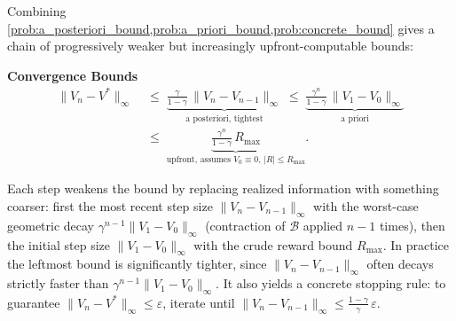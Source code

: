 \documentclass[11pt]{article}
\begin{document}


\begin{remark}
Combining \cref{prob:a_posteriori_bound,prob:a_priori_bound,prob:concrete_bound} gives a chain of progressively weaker but increasingly upfront-computable bounds:
\end{remark}

\begin{callout}[note]
\textbf{Convergence Bounds}
\begin{align*}
\|V_n - V^*\|_\infty
\;&\le\; \underbrace{\tfrac{\gamma}{1-\gamma}\, \|V_n - V_{n-1}\|_\infty}_{\text{a~posteriori, tightest}}
\;\le\; \underbrace{\tfrac{\gamma^n}{1-\gamma}\, \|V_1 - V_0\|_\infty}_{\text{a~priori}} \\
\;&\le\; \underbrace{\tfrac{\gamma^n}{1-\gamma}\, R_{\max}}_{\text{upfront, assumes } V_0 \equiv 0,\, |R| \le R_{\max}}.
\end{align*}
\end{callout}
Each step weakens the bound by replacing realized information with something coarser: first the most recent step size $\|V_n - V_{n-1}\|_\infty$ with the worst-case geometric decay $\gamma^{n-1}\|V_1 - V_0\|_\infty$ (contraction of $\mathcal{B}$ applied $n-1$ times), then the initial step size $\|V_1 - V_0\|_\infty$ with the crude reward bound $R_{\max}$. In practice the leftmost bound is significantly tighter, since $\|V_n - V_{n-1}\|_\infty$ often decays strictly faster than $\gamma^{n-1}\|V_1 - V_0\|_\infty$. It also yields a concrete stopping rule: to guarantee $\|V_n - V^*\|_\infty \le \varepsilon$, iterate until $\|V_n - V_{n-1}\|_\infty \le \frac{1-\gamma}{\gamma}\, \varepsilon$.
\end{document}
